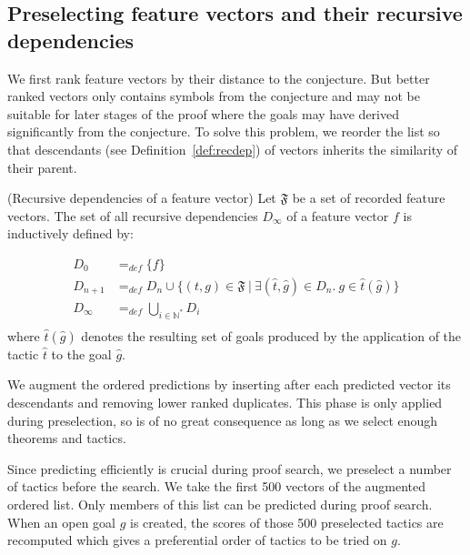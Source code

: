 \documentclass[runningheads,a4paper,draft]{svjour3}
\begin{document}
\subsection{Preselecting feature vectors and their  
recursive dependencies}\label{sec:dependencies}
We first rank feature vectors by their distance to the conjecture. But better 
ranked vectors only contains symbols from 
the conjecture and may not be suitable for later stages of the proof where the 
goals may have derived significantly from the conjecture. To solve this 
problem, we reorder the list so that descendants (see 
Definition~\ref{def:recdep}) of vectors inherits the similarity of their 
parent.

\begin{definition}(Recursive dependencies of a feature 
vector)\label{def:recdep}
Let $\mathfrak{F}$ be a set of recorded feature vectors. 
The set of all recursive dependencies $D_\infty$ of a feature vector $f$ is 
inductively defined by:

\begin{align*}
D_0 &=_{def} \lbrace f \rbrace \\
D_{n+1} &=_{def} D_n \cup \lbrace (t,g)\in \mathfrak{F}\  |\ \exists 
(\hat{t},\hat{g}) \in D_n.\ g \in \hat{t}(\hat{g}) \rbrace  \\
D_\infty &=_{def} \bigcup_{i \in \mathbb{N}^*} D_i\\
\end{align*}
where $\hat{t}(\hat{g})$ denotes the resulting set of goals produced by the 
application 
of the tactic $\hat{t}$ to the goal $\hat{g}$.
\end{definition}

We augment the ordered predictions by inserting after each predicted vector 
its descendants and removing lower ranked duplicates. 
 This phase is only applied 
during preselection, so is of no great consequence as long as we select enough 
theorems and tactics.

Since predicting efficiently is crucial during proof 
search, we preselect a number of tactics before the search.
We take the first 500 vectors of the augmented ordered list. Only members of 
this list can be predicted during proof search. When an 
open goal $g$ is created, the scores of those 500 preselected tactics are
recomputed which gives a preferential order of tactics to be tried on $g$.


\end{document}
